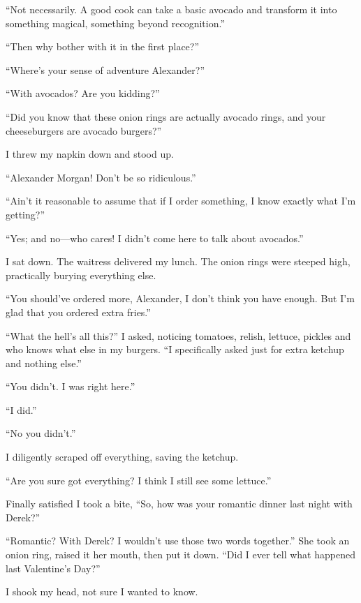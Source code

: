 ``Not necessarily. A good cook can take a basic avocado and transform it
into something magical, something beyond recognition.''

``Then why bother with it in the first place?''

``Where's your sense of adventure Alexander?''

``With avocados? Are you kidding?''

``Did you know that these onion rings are actually avocado rings, and
your cheeseburgers are avocado burgers?''

I threw my napkin down and stood up.

``Alexander Morgan! Don't be so ridiculous.''

``Ain't it reasonable to assume that if I order something, I know
exactly what I'm getting?''

``Yes; and no---who cares! I didn't come here to talk about avocados.''

I sat down. The waitress delivered my lunch. The onion rings were
steeped high, practically burying everything else.

``You should've ordered more, Alexander, I don't think you have enough.
But I'm glad that you ordered extra fries.''

``What the hell's all this?'' I asked, noticing tomatoes, relish,
lettuce, pickles and who knows what else in my burgers. ``I specifically
asked just for extra ketchup and nothing else.''

``You didn't. I was right here.''

``I did.''

``No you didn't.''

I diligently scraped off everything, saving the ketchup.

``Are you sure got everything? I think I still see some lettuce.''

Finally satisfied I took a bite, ``So, how was your romantic dinner last
night with Derek?''

``Romantic? With Derek? I wouldn't use those two words together.'' She
took an onion ring, raised it her mouth, then put it down. ``Did I ever
tell what happened last Valentine's Day?''

I shook my head, not sure I wanted to know.

